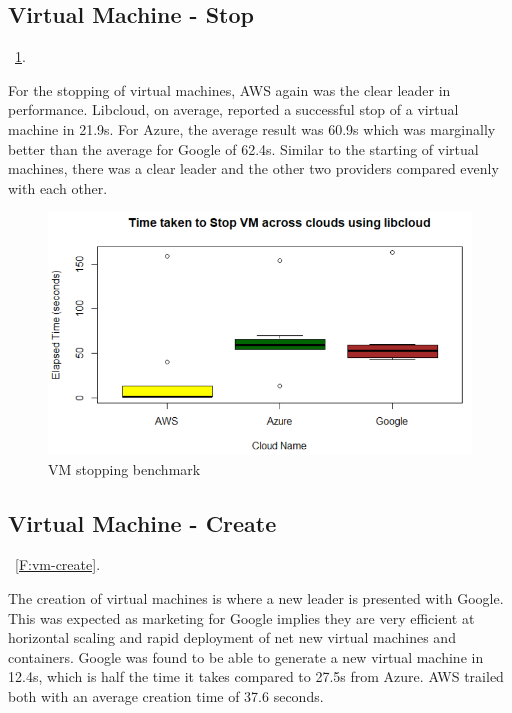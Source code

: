 \subsection{Virtual Machine - Stop}~\ref{F:vm-stop}.

For the stopping of virtual machines, AWS again was the clear leader in
performance. Libcloud, on average, reported a successful stop of a virtual
machine in 21.9s. For Azure, the average result was 60.9s which was marginally
better than the average for Google of 62.4s. Similar to the starting of virtual
machines, there was a clear leader and the other two providers compared evenly
with each other.

\begin{figure}[!ht]
  \centering
  \includegraphics[width=\columnwidth]{images/StopVM.png}
  \caption{VM stopping benchmark}\label{F:vm-stop}
\end{figure}

\subsection{Virtual Machine - Create}~\ref{F:vm-create}.

The creation of virtual machines is where a new leader is presented with
Google. This was expected as marketing for Google implies they are very
efficient at horizontal scaling and rapid deployment of net new virtual
machines and containers. Google was found to be able to generate a new virtual
machine in 12.4s, which is half the time it takes compared to 27.5s from Azure.
AWS trailed both with an average creation time of 37.6 seconds.

